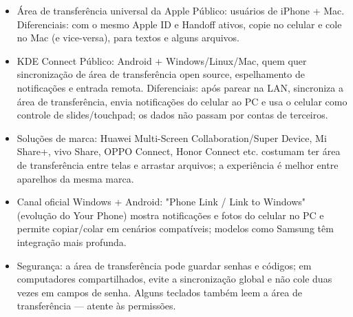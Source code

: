 \begin{itemize}
  \item Área de transferência universal da Apple Público: usuários de iPhone + Mac. Diferenciais: com o mesmo Apple ID e Handoff ativos, copie no celular e cole no Mac (e vice-versa), para textos e alguns arquivos.
  \item KDE Connect Público: Android + Windows/Linux/Mac, quem quer sincronização de área de transferência open source, espelhamento de notificações e entrada remota. Diferenciais: após parear na LAN, sincroniza a área de transferência, envia notificações do celular ao PC e usa o celular como controle de slides/touchpad; os dados não passam por contas de terceiros.
  \item Soluções de marca: Huawei Multi-Screen Collaboration/Super Device, Mi Share+, vivo Share, OPPO Connect, Honor Connect etc. costumam ter área de transferência entre telas e arrastar arquivos; a experiência é melhor entre aparelhos da mesma marca.
  \item Canal oficial Windows + Android: "Phone Link / Link to Windows" (evolução do Your Phone) mostra notificações e fotos do celular no PC e permite copiar/colar em cenários compatíveis; modelos como Samsung têm integração mais profunda.
  \item Segurança: a área de transferência pode guardar senhas e códigos; em computadores compartilhados, evite a sincronização global e não cole duas vezes em campos de senha. Alguns teclados também leem a área de transferência — atente às permissões.
\end{itemize}


